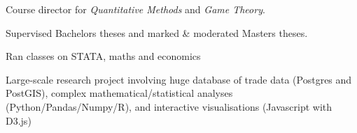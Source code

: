 \documentclass[a4paper,nomath]{deedy-resume} %
\begin{document}
\begin{paracol}{2}
\begin{tightitemize}
    \end{tightitemize}
    
    \sectionspace %


    \vspace{\topsep} %
    \begin{tightitemize}
    	\item Course director for \textit{Quantitative Methods} and \textit{Game Theory}.
		\item Supervised Bachelors theses and marked \& moderated Masters theses.
    	
    \end{tightitemize}
    
    \sectionspace %


    
    \begin{tightitemize}
    	\item Ran classes on STATA, maths and economics
    	
    \end{tightitemize}
    
    \sectionspace %
    

    \begin{tightitemize}
        \item Large-scale research project involving huge database of trade data (Postgres and PostGIS),
        complex mathematical/statistical analyses (Python/Pandas/Numpy/R), and interactive visualisations (Javascript with D3.js)
    \end{tightitemize}

    \sectionspace %


\end{paracol}
\end{document}
